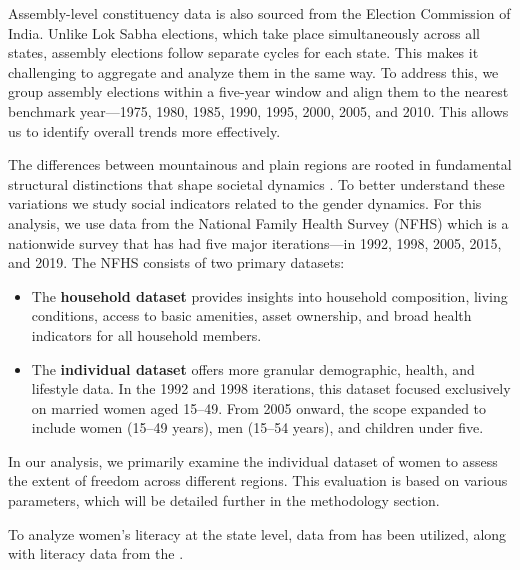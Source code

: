 \vspace{0.3cm}

Assembly-level constituency data is also sourced from the Election Commission of India. Unlike Lok Sabha elections, which take place simultaneously across all states, assembly elections follow separate cycles for each state. This makes it challenging to aggregate and analyze them in the same way. To address this, we group assembly elections within a five-year window and align them to the nearest benchmark year—1975, 1980, 1985, 1990, 1995, 2000, 2005, and 2010. This allows us to identify overall trends more effectively.

\vspace{0.3 cm}

The differences between mountainous and plain regions  are rooted in fundamental structural distinctions that shape societal dynamics \citep{jamesscott}. To better understand these variations we study social indicators related to the gender dynamics. For this analysis, we use data from the National Family Health Survey (NFHS) which is a  nationwide survey that has had five major iterations—in 1992, 1998, 2005, 2015, and 2019. The NFHS consists of two primary datasets: 

\begin{itemize}
    \item The \textbf{household dataset} provides insights into household composition, living conditions, access to basic amenities, asset ownership, and broad health indicators for all household members.
\item The \textbf{individual dataset} offers more granular demographic, health, and lifestyle data. In the 1992 and 1998 iterations, this dataset focused exclusively on married women aged 15–49. From 2005 onward, the scope expanded to include women (15–49 years), men (15–54 years), and children under five.
\end{itemize}

In our analysis, we primarily examine the individual dataset of women to assess the extent of freedom across different regions. This evaluation is based on various parameters, which will be detailed further in the methodology section.

\vspace{0.3 cm}

To analyze women's literacy at the state level, data from \cite{census1991,census2001,census2011} has been utilized, along with literacy data from the \cite{NSC2017}.


